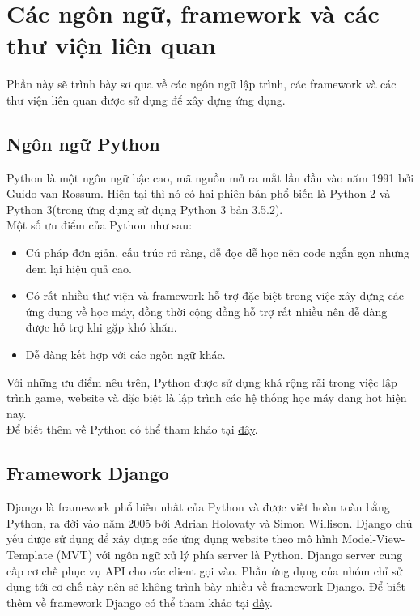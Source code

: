 \section{Các ngôn ngữ, framework và các thư viện liên quan}
Phần này sẽ trình bày sơ qua về các ngôn ngữ lập trình, các framework và các thư viện liên quan được sử dụng để xây dựng ứng dụng.
\subsection{Ngôn ngữ Python}
Python là một ngôn ngữ bậc cao, mã nguồn mở ra mắt lần đầu vào năm 1991 bởi Guido van Rossum. Hiện tại thì nó có hai phiên bản phổ biến là Python 2 và Python 3(trong ứng dụng sử dụng Python 3 bản 3.5.2).\\
Một số ưu điểm của Python như sau:
\begin{itemize}
    \item Cú pháp đơn giản, cấu trúc rõ ràng, dễ đọc dễ học nên code ngắn gọn nhưng đem lại hiệu quả cao.
    \item Có rất nhiều thư viện và framework hỗ trợ đặc biệt trong việc xây dựng các ứng dụng về học máy, đồng thời cộng đồng hỗ trợ rất nhiều nên dễ dàng được hỗ trợ khi gặp khó khăn.
    \item Dễ dàng kết hợp với các ngôn ngữ khác.
\end{itemize}
Với những ưu điểm nêu trên, Python được sử dụng khá rộng rãi trong việc lập trình game, website và đặc biệt là lập trình các hệ thống học máy đang hot hiện nay.\\

Để biết thêm về Python có thể tham khảo tại \href{https://docs.python.org}{đây}.
\subsection{Framework Django}
Django là framework phổ biến nhất của Python và được viết hoàn toàn bằng Python, ra đời vào năm 2005 bởi Adrian Holovaty và Simon Willison. Django chủ yếu được sử dụng để xây dựng các ứng dụng website theo mô hình Model-View-Template (MVT) với ngôn ngữ xử lý phía server là Python. Django server cung cấp cơ chế phục vụ API cho các client gọi vào. Phần ứng dụng của nhóm chỉ sử dụng tới cơ chế này nên sẽ không trình bày nhiều về framework Django. Để biết thêm về framework Django có thể tham khảo tại \href{https://docs.djangoproject.com/en/2.2/}{đây}. 
